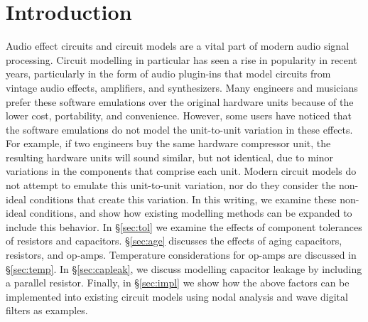 \documentclass[twoside,a4paper]{article}
\title{\papertitle}
\affiliation{
\paperauthorA \,}
{\href{http://ccrma.stanford.edu}{Center for Computer Research in Music and Acoustics} \\ Stanford University \\ Palo Alto, CA \\ {\tt \href{mailto:jatin@ccrma.stanford.edu}{jatin@ccrma.stanford.edu}}}
\newif\ifpdf
\begin{document}
\ifpdf %
  \DeclareGraphicsExtensions{.png,.jpg,.pdf}
\else  %
\fi

\maketitle
%
\begin{abstract}
Traditional circuit modelling methods typically assume ideal
circuit components. Real world audio circuits exhibit
variations in behavior due to non-ideal factors including
component tolerances, operating temperature, and aging.
We present a brief discussion of each of these non-ideal
factors for resistors, capacitors, and operational amplifiers
(op-amps), and show how they each individually affect the
behavior of a circuit model. We present a models of Sallen-Key
lowpass filter, and diode clipper circuits that incorporates all
of the non-ideal factors together.
\end{abstract}

\section{Introduction} \label{sec:intro}
%
Audio effect circuits and circuit models are a vital part
of modern audio signal processing. Circuit modelling in
particular has seen a rise in popularity in recent years,
particularly in the form of audio plugin-ins that model
circuits from vintage audio effects, amplifiers, and synthesizers.
Many engineers and musicians prefer these software emulations over
the original hardware units because of the lower cost, portability,
and convenience. However, some users have noticed that the software
emulations do not model the unit-to-unit variation in these effects.
For example, if two engineers buy the same hardware compressor unit,
the resulting hardware units will sound similar, but not identical,
due to minor variations in the components that comprise each unit.
Modern circuit models do not attempt to emulate this unit-to-unit
variation, nor do they consider the non-ideal conditions that create
this variation.
\newline\newline
In this writing, we examine these non-ideal conditions, and show how
existing modelling methods can be expanded to include this behavior.
In \S\ref{sec:tol} we examine the effects of component tolerances of resistors
and capacitors. \S\ref{sec:age} discusses the effects of aging capacitors,
resistors, and op-amps. Temperature considerations for
op-amps are discussed in \S\ref{sec:temp}. In \S\ref{sec:capleak}, we
discuss modelling capacitor leakage by including a parallel resistor.
Finally, in \S\ref{sec:impl} we show how the above factors can be
implemented into existing circuit models using nodal analysis and wave
digital filters as examples.
\end{document}
